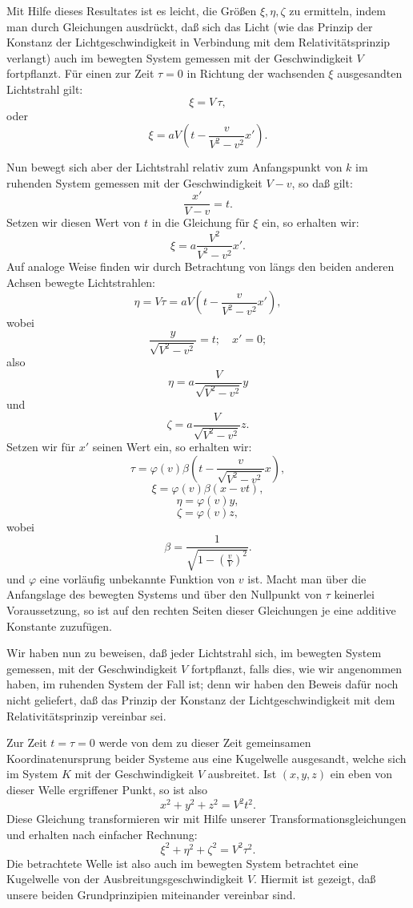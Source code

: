 \documentclass[17pt]{webarticle}       %
\begin{document}
Mit Hilfe dieses Resultates ist es leicht, die Größen \( \xi, \eta, \zeta \) zu ermitteln, indem man durch Gleichungen ausdrückt, daß sich das Licht (wie das Prinzip der Konstanz der Lichtgeschwindigkeit in Verbindung mit dem Relativitätsprinzip verlangt) auch im bewegten System gemessen mit der Geschwindigkeit \( V \) fortpflanzt. Für einen zur Zeit \( \tau = 0 \) in Richtung der wachsenden \( \xi \) ausgesandten Lichtstrahl gilt:
\[
\xi = V \, \tau,
\]
oder
\[
\xi = a V \left( t - \frac{v}{V^2 - v^2} x' \right) .
\]

Nun bewegt sich aber der Lichtstrahl relativ zum Anfangspunkt von \( k \) im ruhenden System gemessen mit der Geschwindigkeit \( V - v \), so daß gilt:
\[
\frac{x'}{V - v} = t.
\]
Setzen wir diesen Wert von \( t \) in die Gleichung für \( \xi \) ein, so erhalten wir:
\[
\xi = a \frac{V^2}{V^2 - v^2} x'.
\]
Auf analoge Weise finden wir durch Betrachtung von längs den beiden anderen Achsen bewegte Lichtstrahlen:
\[
\eta = V \tau = a V \left( t - \frac{v}{V^2 - v^2} x' \right),
\]
wobei
\[
\frac{y}{\sqrt{V^2 - v^2}} = t; \quad x' = 0;
\]
also
\[
\eta = a \frac{V}{\sqrt{V^2 - v^2}} y
\]
und
\[
\zeta = a \frac{V}{\sqrt{V^2 - v^2}} z.
\]
Setzen wir für \( x' \) seinen Wert ein, so erhalten wir:
\[
\tau = \varphi(v) \beta \left( t - \frac{v}{\sqrt{V^2 - v^2}} x \right),
\]
\[
\xi = \varphi(v) \beta (x - vt),
\]
\[
\eta = \varphi(v) y,
\]
\[
\zeta = \varphi(v) z,
\]
wobei
\[
\beta = \frac{1}{\sqrt{1 - \left( \frac{v}{V} \right)^2}}.
\]
und \(\varphi\) eine vorläufig unbekannte Funktion von \( v \) ist. Macht man über die Anfangslage des bewegten Systems und über den Nullpunkt von \( \tau \) keinerlei Voraussetzung, so ist auf den rechten Seiten dieser Gleichungen je eine additive Konstante zuzufügen.

Wir haben nun zu beweisen, daß jeder Lichtstrahl sich, im bewegten System gemessen, mit der Geschwindigkeit \( V \) fortpflanzt, falls dies, wie wir angenommen haben, im ruhenden System der Fall ist; denn wir haben den Beweis dafür noch nicht geliefert, daß das Prinzip der Konstanz der Lichtgeschwindigkeit mit dem Relativitätsprinzip vereinbar sei.

Zur Zeit \( t = \tau = 0 \) werde von dem zu dieser Zeit gemeinsamen Koordinatenursprung beider Systeme aus eine Kugelwelle ausgesandt, welche sich im System \( K \) mit der Geschwindigkeit \( V \) ausbreitet. Ist \( (x, y, z) \) ein eben von dieser Welle ergriffener Punkt, so ist also
\[
x^2 + y^2 + z^2 = V^2 t^2.
\]
Diese Gleichung transformieren wir mit Hilfe unserer Transformationsgleichungen und erhalten nach einfacher Rechnung:
\[
\xi^2 + \eta^2 + \zeta^2 = V^2 \tau^2.
\]
Die betrachtete Welle ist also auch im bewegten System betrachtet eine Kugelwelle von der Ausbreitungsgeschwindigkeit \( V \). Hiermit ist gezeigt, daß unsere beiden Grundprinzipien miteinander vereinbar sind.
\end{document}
